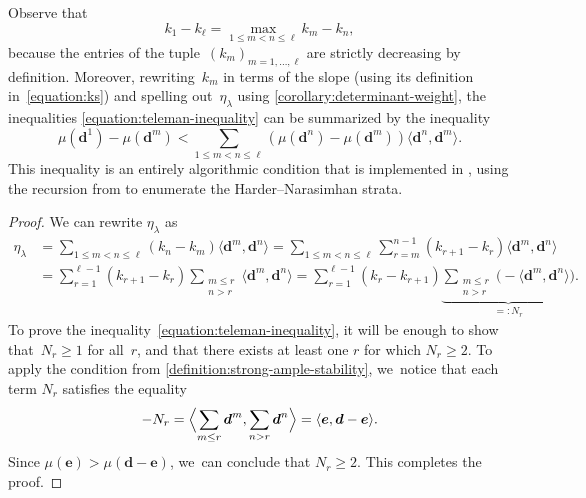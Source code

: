 \documentclass[11pt]{article}
\theoremstyle{plain}
\theoremstyle{definition}
\newcommand\tuple[1]{\ensuremath{{\boldsymbol{#1}}}}
\begin{document}
Observe that\vspace*{-5pt}
\begin{equation*}
k_1-k_\ell=\max_{1\leq m<n\leq\ell}k_m-k_n,
\end{equation*}
because the entries of the tuple~$(k_m)_{m=1,\ldots,\ell}$ are strictly decreasing by definition.
Moreover,
rewriting~$k_m$ in terms of the slope
(using its definition in~\eqref{equation:ks})
and spelling out~$\eta_\lambda$ using \cref{corollary:determinant-weight},
the inequalities \eqref{equation:teleman-inequality}
can be summarized by the inequality\vspace*{-1pt}
\begin{equation}
\label{equation:teleman-inequality-for-real}
\mu(\tuple{d}^1)-\mu(\tuple{d}^m)
<
\sum_{1\leq m<n\leq\ell}\left( \mu(\tuple{d}^n)-\mu(\tuple{d}^m) \right)\langle\tuple{d}^n,\tuple{d}^m\rangle.
\end{equation}
This inequality is an entirely algorithmic condition that is implemented in \cite{quivertools},
using the recursion from \cite[Cor.\,3.5]{MR1974891} to enumerate the Harder--Narasimhan strata.

\begin{proof}
We can rewrite $\eta_\lambda$ as\vspace*{-5pt}
\begin{align*}
\eta_\lambda
&= \sum_{1\leq m < n\leq\ell} (k_n - k_m)\langle \tuple{d}^m,\tuple{d}^n \rangle= \sum_{1\leq m < n\leq\ell} \sum_{r = m}^{n-1} (k_{r+1} - k_r) \langle \tuple{d}^m,\tuple{d}^n \rangle \\
&= \sum_{r = 1}^{\ell-1} (k_{r+1} - k_r)\sum_{\substack{m \leq r \\ n > r}} \langle \tuple{d}^m, \tuple{d}^n \rangle= \sum_{r = 1}^{\ell-1} (k_r - k_{r+1})\underbrace{\sum_{\substack{m \leq r \\ n > r}} \bigl( - \langle \tuple{d}^m, \tuple{d}^n \rangle\bigr)}_{=: N_r}.
\end{align*}
To prove the inequality~\eqref{equation:teleman-inequality},
it will be enough to show that~$N_r \geq 1$ for all~$r$,
and that there exists at least one $r$ for which $N_r \geq 2$.
To apply the condition from \cref{definition:strong-ample-stability}, we~notice that each term $N_r$ satisfies the equality
\begin{equation*}
-N_r = \Bigl\langle \sum_{m \leq r} \tuple{d}^m, \sum_{n > r} \tuple{d}^n \Bigr\rangle
= \langle \tuple{e}, \tuple{d} - \tuple{e} \rangle.
\end{equation*}
Since $\mu(\tuple{e}) > \mu(\tuple{d} - \tuple{e})$, we~can conclude that $N_r \geq 2$.
This completes the proof.
\end{proof}
\end{document}
